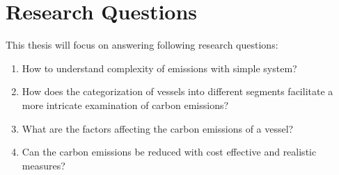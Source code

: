 \section{Research Questions}

This thesis will focus on answering following research questions:

\begin{enumerate}
    \item How to understand complexity of emissions with simple system?
    \item How does the categorization of vessels into different segments facilitate a more intricate examination of carbon emissions?
    \item What are the factors affecting the carbon emissions of a vessel?
    \item Can the carbon emissions be reduced with cost effective and realistic measures?
\end{enumerate}